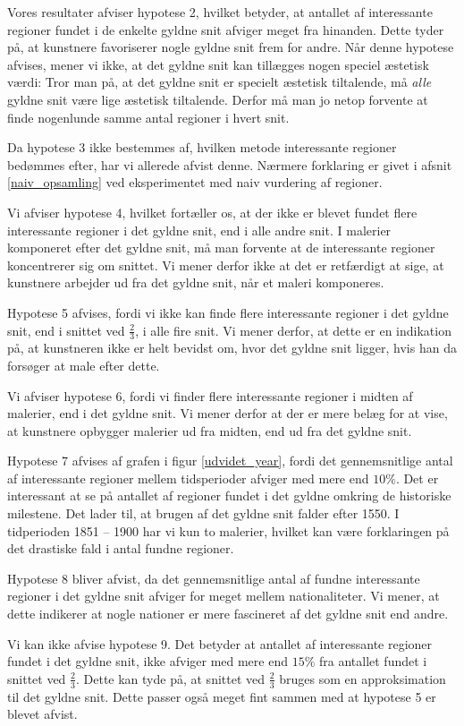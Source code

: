 {Vores resultater afviser hypotese 2, hvilket betyder, at antallet af
interessante regioner fundet i de enkelte gyldne snit afviger meget fra
hinanden.  Dette tyder på, at kunstnere favoriserer nogle gyldne snit
frem for andre. Når denne hypotese afvises, mener vi ikke, at det gyldne
snit kan tillægges nogen speciel æstetisk værdi: Tror man på, at det
gyldne snit er specielt æstetisk tiltalende, må \emph{alle} gyldne snit
være lige æstetisk tiltalende. Derfor må man jo netop forvente at finde
nogenlunde samme antal regioner i hvert snit.

Da hypotese 3 ikke bestemmes af, hvilken metode interessante regioner
bedømmes efter, har vi allerede afvist denne. Nærmere forklaring er
givet i afsnit \ref{naiv_opsamling} ved eksperimentet med naiv vurdering
af regioner.

Vi afviser hypotese 4, hvilket fortæller os, at der ikke er blevet
fundet flere interessante regioner i det gyldne snit, end i alle andre
snit.  I malerier komponeret efter det gyldne snit, må man forvente at
de interessante regioner koncentrerer sig om snittet. Vi mener derfor
ikke at det er retfærdigt at sige, at kunstnere arbejder ud fra det
gyldne snit, når et maleri komponeres.

Hypotese 5 afvises, fordi vi ikke kan finde flere interessante regioner
i det gyldne snit, end i snittet ved $\frac{2}{3}$, i alle fire snit. Vi
mener derfor, at dette er en indikation på, at kunstneren ikke er helt
bevidst om, hvor det gyldne snit ligger, hvis han da forsøger at male
efter dette.

Vi afviser hypotese 6, fordi vi finder flere interessante regioner i
midten af malerier, end i det gyldne snit. Vi mener derfor at der er
mere belæg for at vise, at kunstnere opbygger malerier ud fra midten,
end ud fra det gyldne snit.

Hypotese 7 afvises af grafen i figur \ref{udvidet_year}, fordi det
gennemsnitlige antal af interessante regioner mellem tidsperioder
afviger med mere end $10 \%$. Det er interessant at se på antallet af
regioner fundet i det gyldne omkring de historiske milestene. Det lader
til, at brugen af det gyldne snit falder efter 1550. I tidperioden 1851
-- 1900 har vi kun to malerier, hvilket kan være forklaringen på det
drastiske fald i antal fundne regioner.

Hypotese 8 bliver afvist, da det gennemsnitlige antal af fundne
interessante regioner i det gyldne snit afviger for meget mellem
nationaliteter. Vi mener, at dette indikerer at nogle nationer er mere
fascineret af det gyldne snit end andre.

Vi kan ikke afvise hypotese 9. Det betyder at antallet af interessante
regioner fundet i det gyldne snit, ikke afviger med mere end $15 \%$ fra
antallet fundet i snittet ved $\frac{2}{3}$. Dette kan tyde på, at
snittet ved $\frac{2}{3}$ bruges som en approksimation til det gyldne
snit. Dette passer også meget fint sammen med at hypotese 5 er blevet
afvist.

} %

